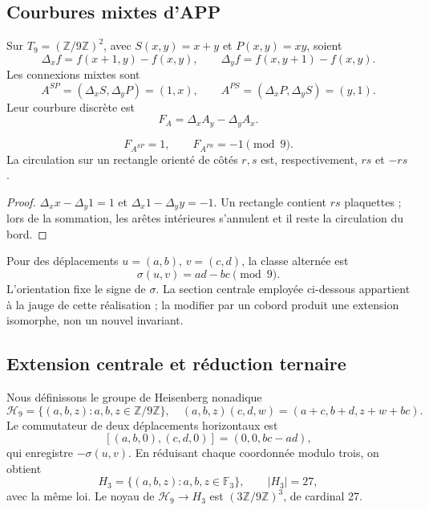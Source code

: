 \subsection{Courbures mixtes d’APP}

Sur \(T_9=(\mathbb Z/9\mathbb Z)^2\), avec
\(S(x,y)=x+y\) et \(P(x,y)=xy\), soient
\[
 \Delta_xf=f(x+1,y)-f(x,y),\qquad
 \Delta_yf=f(x,y+1)-f(x,y).
\]
Les connexions mixtes sont
\[
 A^{SP}=(\Delta_xS,\Delta_yP)=(1,x),\qquad
 A^{PS}=(\Delta_xP,\Delta_yS)=(y,1).
\]
Leur courbure discrète est
\[
 F_A=\Delta_xA_y-\Delta_yA_x.
\]

\begin{proposition}
\label{p12-83-c20-s6:prop:curvaturas-app-e6-nuevo}
\[
 F_{A^{SP}}=1,\qquad F_{A^{PS}}=-1\pmod9.
\]
La circulation sur un rectangle orienté de côtés \(r,s\) est,
respectivement, \(rs\) et \(-rs\).
\end{proposition}

\begin{proof}
\(\Delta_xx-\Delta_y1=1\) et
\(\Delta_x1-\Delta_yy=-1\). Un rectangle contient \(rs\) plaquettes ; lors de la
sommation, les arêtes intérieures s’annulent et il reste la circulation du bord.
\end{proof}

Pour des déplacements \(u=(a,b)\), \(v=(c,d)\), la classe alternée est
\begin{equation}
 \sigma(u,v)=ad-bc\pmod9.
 \label{p12-83-c20-s6:eq:forma-alternante-e6-nueva}
\end{equation}
L’orientation fixe le signe de \(\sigma\). La section centrale employée
ci-dessous appartient à la jauge de cette réalisation ; la modifier par un cobord
produit une extension isomorphe, non un nouvel invariant.

\subsection{Extension centrale et réduction ternaire}

Nous définissons le groupe de Heisenberg nonadique
\begin{equation}
 \mathcal H_9=\{(a,b,z):a,b,z\in\mathbb Z/9\mathbb Z\},
 \quad
 (a,b,z)(c,d,w)=(a+c,b+d,z+w+bc).
 \label{p12-83-c20-s6:eq:heisenberg-9-nuevo}
\end{equation}
Le commutateur de deux déplacements horizontaux est
\[
 [(a,b,0),(c,d,0)]=(0,0,bc-ad),
\]
qui enregistre \(-\sigma(u,v)\). En réduisant chaque coordonnée modulo trois, on
obtient
\begin{equation}
 H_3=\{(a,b,z):a,b,z\in\mathbb F_3\},\qquad |H_3|=27,
 \label{p12-83-c20-s6:eq:heisenberg-3-nuevo}
\end{equation}
avec la même loi. Le noyau de \(\mathcal H_9\to H_3\) est \((3\mathbb Z/9\mathbb Z)^3\), de cardinal 27.

